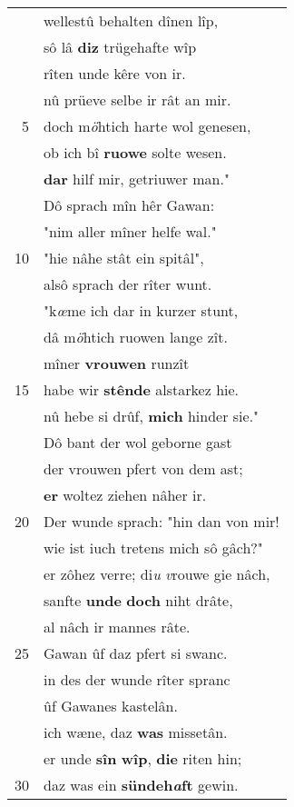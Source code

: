 \documentclass[8pt,a4paper,notitlepage]{article}
\begin{document}
\begin{table}[ht]
\begin{minipage}[t]{0.5\linewidth}
\begin{center}
\end{center}
\begin{tabular}{rl}
 & wellestû behalten dînen lîp,\\ 
 & sô lâ \textbf{diz} trügehafte wîp\\ 
 & rîten unde kêre von ir.\\ 
 & nû prüeve selbe ir rât an mir.\\ 
5 & doch m\textit{ö}htich harte wol genesen,\\ 
 & ob ich bî \textbf{ruowe} solte wesen.\\ 
 & \textbf{dar} hilf mir, getriuwer man."\\ 
 & Dô sprach mîn hêr Gawan:\\ 
 & "nim aller mîner helfe wal."\\ 
10 & "hie nâhe stât ein spitâl",\\ 
 & alsô sprach der rîter wunt.\\ 
 & "k\textit{œ}me ich dar in kurzer stunt,\\ 
 & dâ m\textit{ö}htich ruowen lange zît.\\ 
 & mîner \textbf{vrouwen} runzît\\ 
15 & habe wir \textbf{stênde} alstarkez hie.\\ 
 & nû hebe si drûf, \textbf{mich} hinder sie."\\ 
 & Dô bant der wol geborne gast\\ 
 & der vrouwen pfert von dem ast;\\ 
 & \textbf{er} woltez ziehen nâher ir.\\ 
20 & Der wunde sprach: "hin dan von mir!\\ 
 & wie ist iuch tretens mich sô gâch?"\\ 
 & er zôhez verre; di\textit{u} \textit{v}rouwe gie nâch,\\ 
 & sanfte \textbf{unde} \textbf{doch} niht drâte,\\ 
 & al nâch ir mannes râte.\\ 
25 & Gawan ûf daz pfert si swanc.\\ 
 & in des der wunde rîter spranc\\ 
 & ûf Gawanes kastelân.\\ 
 & ich wæne, daz \textbf{was} missetân.\\ 
 & er unde \textbf{sîn} \textbf{wîp}, \textbf{die} riten hin;\\ 
30 & daz was ein \textbf{sündeh\textit{a}ft} gewin.\\ 
\end{tabular}

\end{minipage}
\end{table}
\end{document}
